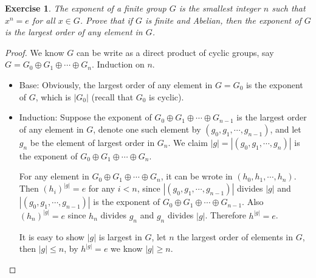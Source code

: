 \documentclass[14pt]{extarticle}
\newtheorem{exercise}{Exercise}[section]
\newcommand{\join}[3][,]{#2_0 #1 #2_1 #1 \cdots #1 #2_{#3}}
\newcommand{\Oplus}[2]{\join[\oplus]{#1}{#2}}
\newcommand{\1}{\{e\}}
\begin{document}
\setcounter{exercise}{44}
\begin{exercise}
  The exponent of a finite group $G$ is the smallest integer $n$
  such that $x^n = e$ for all $x \in G$.
  Prove that if $G$ is finite and Abelian, then the exponent of $G$
  is the largest order of any element in $G$.
\end{exercise}
\begin{proof}
  We know $G$ can be write as a direct product of cyclic groups,
  say $G = \Oplus{G}{n}$. Induction on $n$.
  \begin{itemize}
    \item Base: Obviously, the largest order of any element in $G = G_0$ 
      is the exponent of $G$, which is $|G_0|$ (recall that $G_0$ is cyclic).
    \item Induction: Suppose the exponent of $\Oplus{G}{n - 1}$ is 
      the largest order of any element in $G$, 
      denote one such element by $(\join{g}{n - 1})$,
      and let $g_n$ be the element of largest order in $G_n$.
      We claim $|g| = |(\join{g}{n})|$ is
      the exponent of $\Oplus{G}{n}$.

      For any element in $\Oplus{G}{n}$, it can be wrote in $(\join{h}{n})$.
      Then $(h_i)^{|g|} = e$ for any $i < n$, since $|(\join{g}{n - 1})|$ divides $|g|$
      and $|(\join{g}{n - 1})|$ is the exponent of $\Oplus{G}{n - 1}$.
      Also $(h_n)^{|g|} = e$ since $h_n$ divides $g_n$ and $g_n$ divides $|g|$.
      Therefore $h^{|g|} = e$.

      It is easy to show $|g|$ is largest in $G$, 
      let $n$ the largest order of elements in $G$,
      then $|g| \leq n$, by $h^{|g|} = e$ we know $|g| \geq n$.
  \end{itemize}
\end{proof}
\end{document}
